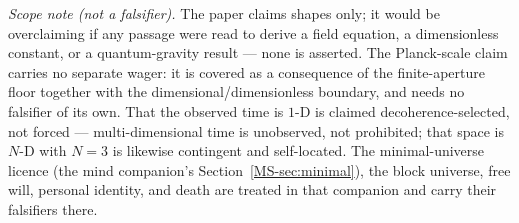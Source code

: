 \documentclass[11pt,a4paper]{article}
\theoremstyle{remark}\newtheorem{remark}[definition]{Remark}
\begin{document}
\noindent\emph{Scope note (not a falsifier).} The paper claims shapes only; it would be
overclaiming if any passage were read to derive a field equation, a dimensionless
constant, or a quantum-gravity result --- none is asserted. The Planck-scale claim carries no
separate wager: it is covered as a consequence of the finite-aperture floor together with the
dimensional/dimensionless boundary, and needs no falsifier of its own. That the observed time is $1$-D is
claimed decoherence-selected, not forced --- multi-dimensional time is unobserved, not prohibited;
that space is $N$-D with $N=3$ is likewise contingent and self-located. The minimal-universe
licence (the mind companion's Section~\ref{MS-sec:minimal}), the block universe, free will,
personal identity, and death are treated in that companion and carry their falsifiers there.
\end{document}
